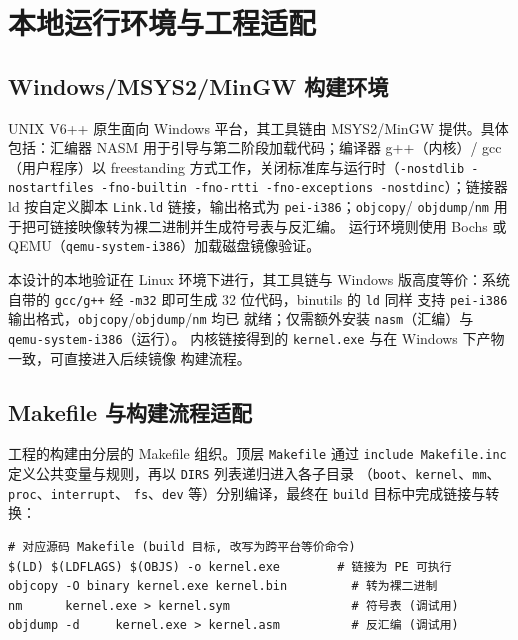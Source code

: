 \chapter{本地运行环境与工程适配}

\section{Windows/MSYS2/MinGW 构建环境}
UNIX V6++ 原生面向 Windows 平台，其工具链由 MSYS2/MinGW 提供。具体包括：汇编器
NASM 用于引导与第二阶段加载代码；编译器 g++（内核）/ gcc（用户程序）以
freestanding 方式工作，关闭标准库与运行时（\texttt{-nostdlib -nostartfiles
-fno-builtin -fno-rtti -fno-exceptions -nostdinc}）；链接器 ld 按自定义脚本
\texttt{Link.ld} 链接，输出格式为 \texttt{pei-i386}；\texttt{objcopy}/
\texttt{objdump}/\texttt{nm} 用于把可链接映像转为裸二进制并生成符号表与反汇编。
运行环境则使用 Bochs 或 QEMU（\texttt{qemu-system-i386}）加载磁盘镜像验证。

本设计的本地验证在 Linux 环境下进行，其工具链与 Windows 版高度等价：系统自带的
\texttt{gcc/g++} 经 \texttt{-m32} 即可生成 32 位代码，binutils 的 \texttt{ld} 同样
支持 \texttt{pei-i386} 输出格式，\texttt{objcopy}/\texttt{objdump}/\texttt{nm} 均已
就绪；仅需额外安装 \texttt{nasm}（汇编）与 \texttt{qemu-system-i386}（运行）。
内核链接得到的 \texttt{kernel.exe} 与在 Windows 下产物一致，可直接进入后续镜像
构建流程。

\section{Makefile 与构建流程适配}
工程的构建由分层的 Makefile 组织。顶层 \texttt{Makefile} 通过 \texttt{include
Makefile.inc} 定义公共变量与规则，再以 \texttt{DIRS} 列表递归进入各子目录
（\texttt{boot}、\texttt{kernel}、\texttt{mm}、\texttt{proc}、\texttt{interrupt}、
\texttt{fs}、\texttt{dev} 等）分别编译，最终在 \texttt{build} 目标中完成链接与转换：

\begin{lstlisting}[caption={内核构建的核心步骤},label={lst:build}]
# 对应源码 Makefile (build 目标, 改写为跨平台等价命令)
$(LD) $(LDFLAGS) $(OBJS) -o kernel.exe        # 链接为 PE 可执行
objcopy -O binary kernel.exe kernel.bin         # 转为裸二进制
nm      kernel.exe > kernel.sym                 # 符号表 (调试用)
objdump -d     kernel.exe > kernel.asm          # 反汇编 (调试用)
\end{lstlisting}

